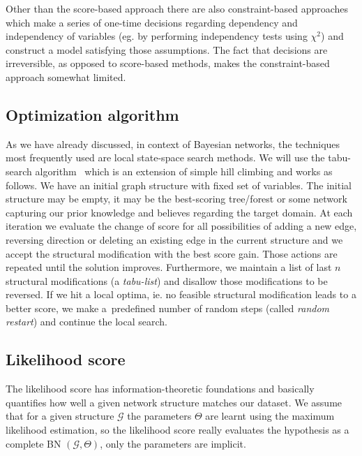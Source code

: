 \documentclass[english,cover]{fitthesis} %
\newcommand{\term}[1]{\emph{#1}}           %
\begin{document}
Other than the score-based approach there are also constraint-based approaches~\cite[p.~786]{pgm} which make a series of one-time decisions regarding dependency and independency of variables (eg. by performing independency tests using $\chi^2$) and construct a model satisfying those assumptions. The fact that decisions are irreversible, as opposed to score-based methods, makes the constraint-based approach somewhat limited.


\subsection{Optimization algorithm}
As we have already discussed, in context of Bayesian networks, the techniques most frequently used are local state-space search methods. We will use the tabu-search algorithm~\cite[p.~816]{pgm} which is an extension of simple hill climbing and works as follows. We have an initial graph structure with fixed set of variables. The initial structure may be empty, it may be the best-scoring tree/forest or some network capturing our prior knowledge and believes regarding the target domain. At each iteration we evaluate the change of score for all possibilities of adding a new edge, reversing direction or deleting an existing edge in the current structure and we accept the structural modification with the best score gain. Those actions are repeated until the solution improves. Furthermore, we maintain a list of last $n$ structural modifications (a \term{tabu-list}) and disallow those modifications to be reversed. If we hit a local optima, ie. no feasible structural modification leads to a better score, we make a~predefined number of random steps (called \term{random restart}) and continue the local search.



\subsection{Likelihood score}
The likelihood score has information-theoretic foundations and basically quantifies how well a given network structure matches our dataset. We assume that for a given structure $\mathcal{G}$ the parameters $\Theta$ are learnt using the maximum likelihood estimation, so the likelihood score really evaluates the hypothesis as a complete BN $(\mathcal{G}, \Theta)$, only the parameters are implicit.
\end{document}
